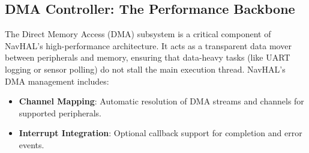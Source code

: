 \subsection{DMA Controller: The Performance Backbone}
The Direct Memory Access (DMA) subsystem is a critical component of NavHAL's high-performance architecture. It acts as a transparent data mover between peripherals and memory, ensuring that data-heavy tasks (like UART logging or sensor polling) do not stall the main execution thread. NavHAL's DMA management includes:
\begin{itemize}
    \item \textbf{Channel Mapping}: Automatic resolution of DMA streams and channels for supported peripherals.
    \item \textbf{Interrupt Integration}: Optional callback support for completion and error events.
\end{itemize}
